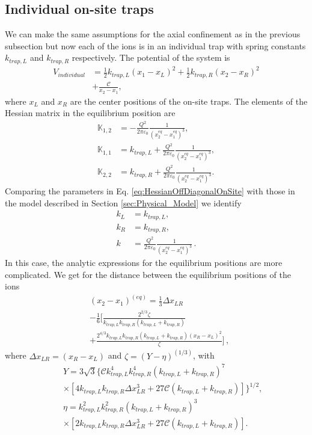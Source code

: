 \subsection{Individual on-site traps}
%
%
%
We can make the same assumptions for the axial confinement as in the previous subsection but now each of the ions is in an individual trap with spring constants $k_{trap,L}$ and $k_{trap,R}$ respectively. The potential of the system is
%
\begin{align}
    V_{individual} &= \frac{1}{2}k_{trap,L}\left(x_1 -x_L\right)^2 +\frac{1}{2}k_{trap, R}\left(x_2 -x_R\right)^2 \nonumber \\&+ \frac{\mathcal{C}}{x_2-x_1},
\end{align}
%
where $x_L$ and $x_R$ are the center positions of the on-site traps. The elements of the Hessian matrix in the equilibrium position are
%
\begin{align}
  \mathbb{K}_{1,2} &= -\frac{Q^2}{2\pi\varepsilon_0}\frac{1}{(x_2^{eq}-x_1^{eq})^3},\nonumber
  \\
  \mathbb{K}_{1,1} &= k_{trap,L} + \frac{Q^2}{2\pi\varepsilon_0}\frac{1}{(x_2^{eq}-x_1^{eq})^3},\nonumber
  \\
  \mathbb{K}_{2,2} &= k_{trap,R} + \frac{Q^2}{2\pi\varepsilon_0}\frac{1}{(x_2^{eq}-x_1^{eq})^3}.
  \label{eq:HessianOffDiagonalOnSite}
\end{align}
%
Comparing the parameters in Eq. \eqref{eq:HessianOffDiagonalOnSite} with those in the model described in Section \ref{sec:Physical_Model} we identify
\begin{align}
  k_L &= k_{trap,L},\nonumber\\
  k_R &= k_{trap,R},\nonumber\\
  k &= \frac{Q^2}{2\pi\varepsilon_0}\frac{1}{(x_2^{eq}-x_1^{eq})^3}\,.
\end{align}
%
In this case, the analytic expressions for the equilibrium positions are more complicated. We get for the distance between the equilibrium positions of the ions
%
\begin{align}
  &(x_2 - x_1)^{(eq)} = \frac{1}{3} \Delta x_{LR}\nonumber\\
  &- \frac{1}{6}\Big[ \frac{2^{2/3}\zeta}{k_{trap,L} k_{trap,R} (k_{trap,L} + k_{trap,R})}\nonumber\\
  &+ \frac{2^{4/3} k_{trap,L} k_{trap,R} (k_{trap,L} + k_{trap,R}) (x_R-x_L)^2}{\zeta} \Big]\,,
\end{align}
%
where $\Delta x_{LR} = (x_R-x_L)$ and $\zeta = \left( Y - \eta \right)^{(1/3)}$, with
%
\begin{eqnarray}
&&Y = 3 \sqrt{3} \bigg\{\mathcal{C} k_{trap,L}^4 k_{trap,R}^4 \left(k_{trap,L}+k_{trap,R}\right)^{7}
\nonumber\\
&&\times\left[4 k_{trap,L} k_{trap,R} \Delta x_{LR}^3+27 \mathcal{C} \left(k_{trap,L}+k_{trap,R}\!\right)\!\right]\!\!\bigg\}^{\!1/2}\!,
\nonumber
%
\\
&&\eta =  k_{trap,L}^2 k_{trap,R}^2 \left(k_{trap,L}+k_{trap,R}\right)^{3}
\nonumber\\
&&\times\left[2 k_{trap,L} k_{trap,R} \Delta x_{LR}^3+27 \mathcal{C} \left(k_{trap,L}+k_{trap,R}\right)\right]\!.
\end{eqnarray}
